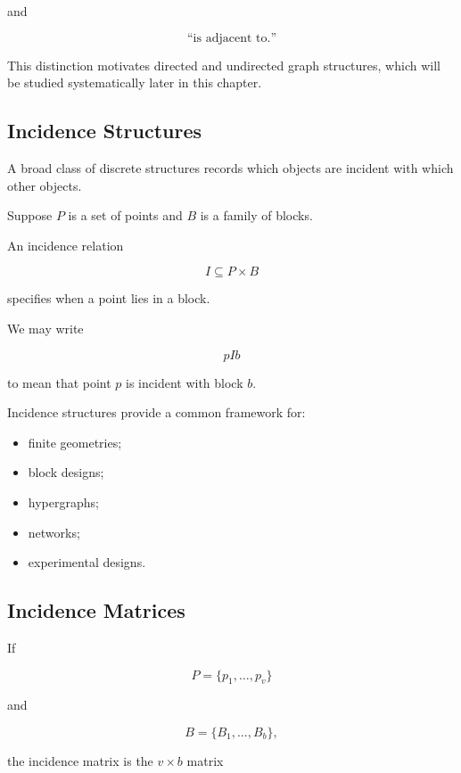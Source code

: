 and

\[
\text{``is adjacent to.''}
\]

This distinction motivates directed and undirected graph structures,
which will be studied systematically later in this chapter.

\subsection{Incidence Structures}
\label{subsec:incidence-structures}

A broad class of discrete structures records which objects are incident
with which other objects.

Suppose \(P\) is a set of points and \(B\) is a family of blocks.

An incidence relation

\[
I\subseteq P\times B
\]

specifies when a point lies in a block.

We may write

\[
pIb
\]

to mean that point \(p\) is incident with block \(b\).

Incidence structures provide a common framework for:

\begin{itemize}
    \item finite geometries;
    \item block designs;
    \item hypergraphs;
    \item networks;
    \item experimental designs.
\end{itemize}

\subsection{Incidence Matrices}
\label{subsec:incidence-matrices-discrete}

If

\[
P=\{p_1,\ldots,p_v\}
\]

and

\[
B=\{B_1,\ldots,B_b\},
\]

the incidence matrix is the \(v\times b\) matrix

